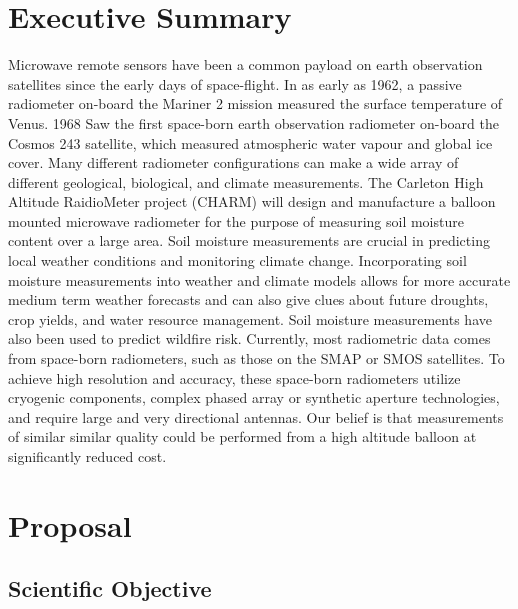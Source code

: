 \documentclass[12pt]{article}
\begin{document}
\listoftables
\newpage

\sectionfont{\scshape}


\section{Executive Summary}
Microwave remote sensors have been a common payload on earth observation satellites since the early days of space-flight. In as early as 1962, a passive radiometer on-board the Mariner 2 mission measured the surface temperature of Venus. 1968 Saw the first space-born earth observation radiometer on-board the Cosmos 243 satellite, which measured atmospheric water vapour and global ice cover. Many different radiometer configurations can make a wide array of different geological, biological, and climate measurements. The Carleton High Altitude RaidioMeter project (CHARM) will design and manufacture a balloon mounted microwave radiometer for the purpose of measuring soil moisture content over a large area. Soil moisture measurements are crucial in predicting local weather conditions and monitoring climate change. Incorporating soil moisture measurements into weather and climate models allows for more accurate medium term weather forecasts and can also give clues about future droughts, crop yields, and water resource management. Soil moisture measurements have also been used to predict wildfire risk. Currently, most radiometric data comes from space-born radiometers, such as those on the SMAP or SMOS satellites. To achieve high resolution and accuracy, these space-born radiometers utilize cryogenic components, complex phased array or synthetic aperture technologies, and require large and very directional antennas. Our belief is that measurements of similar similar quality could be performed from a high altitude balloon at significantly reduced cost. 

\newpage

\section{Proposal}
\subsection{Scientific Objective}
\end{document}
